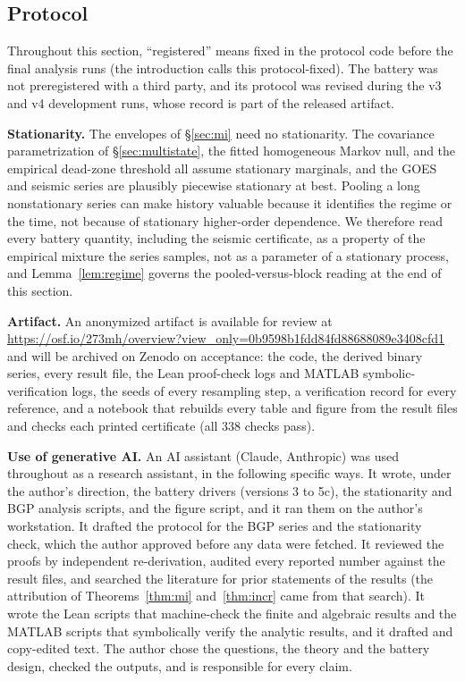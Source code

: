 \documentclass[acmsmall,screen,review,anonymous]{acmart}
\begin{document}
\subsection{Protocol}\label{sec:protocol}

Throughout this section, ``registered'' means fixed in the protocol code
before the final analysis runs (the introduction calls this protocol-fixed). The battery was not preregistered with a
third party, and its protocol was revised during the v3 and v4
development runs, whose record is part of the released artifact.

\textbf{Stationarity.} The envelopes of \S\ref{sec:mi} need no stationarity.
The covariance parametrization of \S\ref{sec:multistate}, the fitted homogeneous
Markov null, and the empirical dead-zone threshold all assume stationary
marginals, and the GOES and seismic series are plausibly piecewise
stationary at best. Pooling a long nonstationary series can make history
valuable because it identifies the regime or the time, not because of
stationary higher-order dependence. We therefore read every battery
quantity, including the seismic certificate, as a property of the
empirical mixture the series samples, not as a parameter of a stationary
process, and Lemma~\ref{lem:regime} governs the pooled-versus-block
reading at the end of this section.

\textbf{Artifact.} An anonymized artifact is available for review at
\url{https://osf.io/273mh/overview?view_only=0b9598b1fdd84fd88688089e3408cfd1}
and will be archived on Zenodo on acceptance: the code, the derived binary
series, every result file, the Lean proof-check logs and MATLAB
symbolic-verification logs, the seeds of every resampling step, a
verification record for every reference, and a notebook that rebuilds
every table and figure from the result files and checks each printed
certificate (all 338 checks pass).

\textbf{Use of generative AI.} An AI assistant (Claude, Anthropic) was used
throughout as a research assistant, in the following specific ways. It
wrote, under the author's direction, the battery drivers (versions 3 to
5c), the stationarity and BGP analysis scripts, and the figure script, and
it ran them on the author's workstation. It drafted the protocol for the
BGP series and the stationarity check, which the author approved before any
data were fetched. It reviewed the proofs by independent re-derivation,
audited every reported number against the result files, and searched the
literature for prior statements of the results (the attribution of
Theorems~\ref{thm:mi} and~\ref{thm:incr} came from that search). It wrote
the Lean scripts that machine-check the finite and algebraic results and
the MATLAB scripts that symbolically verify the analytic results, and it drafted and copy-edited text. The author chose the
questions, the theory and the battery design, checked the outputs, and is
responsible for every claim.
\end{document}
